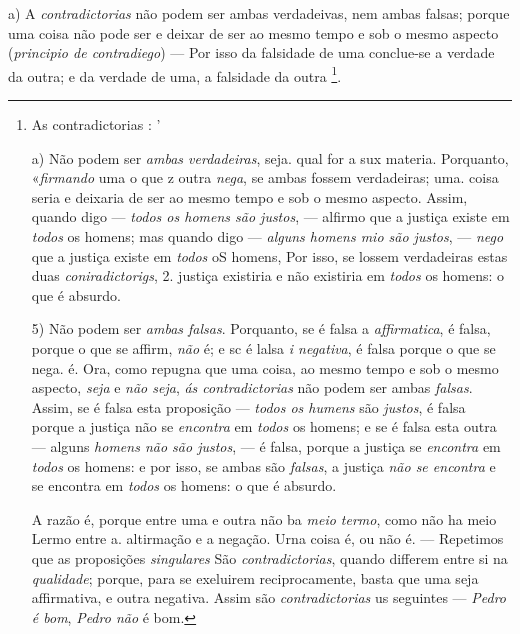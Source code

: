 a) A \emph{contradictorias} não podem ser ambas verdadeivas, nem ambas falsas; porque uma coisa não pode ser e deixar de ser ao mesmo tempo e sob o mesmo aspecto (\emph{principio de contradiego}) --- Por isso da falsidade de uma conclue-se a verdade da outra; e da verdade de uma, a falsidade da outra \footnote{As contradictorias : '\par a) Não podem ser \emph{ambas verdadeiras}, seja. qual for a sux materia. Porquanto, «\emph{firmando} uma o que z outra \emph{nega}, se ambas fossem verdadeiras; uma. coisa seria e deixaria de ser ao mesmo tempo e sob o mesmo aspecto. Assim, quando digo --- \emph{todos os homens são justos}, --- alfirmo que a justiça existe em \emph{todos} os homens; mas quando digo --- \emph{alguns homens mio são justos}, --- \emph{nego} que a justiça existe em \emph{todos} oS homens, Por isso, se lossem verdadeiras estas duas \emph{coniradictorigs}, 2. justiça existiria e não existiria em \emph{todos} os homens: o que é absurdo.\par 5) Não podem ser \emph{ambas falsas}. Porquanto, se é falsa a \emph{affirmatica}, é falsa, porque o que se affirm, \emph{não} é; e sc é lalsa \emph{i negativa}, é falsa porque o que se nega. é. Ora, como repugna que uma coisa, ao mesmo tempo e sob o mesmo aspecto, \emph{seja} e \emph{não seja}, \emph{ás contradictorias} não podem ser ambas \emph{falsas}. Assim, se é falsa esta proposição --- \emph{todos os humens} são \emph{justos}, é falsa porque a justiça não se \emph{encontra} em \emph{todos} os homens; e se é falsa esta outra --- alguns \emph{homens não são justos}, --- é falsa, porque a justiça se \emph{encontra} em \emph{todos} os homens: e por isso, se ambas são \emph{falsas}, a justiça \emph{não se encontra} e se encontra em \emph{todos} os homens: o que é absurdo.\par A razão é, porque entre uma e outra não ba \emph{meio termo}, como não ha meio Lermo entre a. altirmação e a negação. Urna coisa é, ou não é. --- Repetimos que as proposições \emph{singulares} São \emph{contradictorias}, quando differem entre si na \emph{qualidade}; porque, para se exeluirem reciprocamente, basta que uma seja affirmativa, e outra negativa. Assim são \emph{contradictorias} us seguintes --- \emph{Pedro é bom}, \emph{Pedro não} é bom.}.

